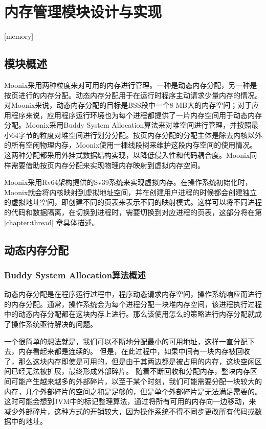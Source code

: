 
\chapter{内存管理模块设计与实现}[memory]
\label{chapter:memory}

\section{模块概述}

Moonix采用两种粒度来对可用的内存进行管理。一种是动态内存分配，另一种是按页进行的内存分配。动态内存分配用于在运行时程序主动请求少量内存的情况。对Moonix来说，动态内存分配的目标是BSS段中一个8 MB大的内存空间；对于应用程序来说，应用程序运行环境也为每个进程都提供了一片内存空间用于动态内存分配。Moonix采用Buddy System Allocation算法来对堆空间进行管理，并按照最小64字节的粒度对堆空间进行划分分配。按页内存分配的分配主体是除去内核以外的所有空闲物理内存，Moonix使用一棵线段树来维护这段内存空间的使用情况。这两种分配都采用外挂式数据结构实现，以降低侵入性和代码耦合度。Moonix同样需要借助按页内存分配来实现物理内存映射到虚拟内存空间。

Moonix采用Rv64架构提供的Sv39系统来实现虚拟内存。在操作系统初始化时，Moonix就会将内核映射到虚拟地址空间，并在创建用户进程的时候都会创建独立的虚拟地址空间，即创建不同的页表来表示不同的映射模式。这样可以将不同进程的代码和数据隔离，在切换到进程时，需要切换到对应进程的页表，这部分将在第 \ref{chapter:thread} 章具体描述。

\section{动态内存分配}

\subsection{Buddy System Allocation算法概述}

动态内存分配是在程序运行过程中，程序动态请求内存空间，操作系统响应而进行的内存分配。通常，操作系统会为每个进程分配一块堆内存空间，该进程执行过程中的动态内存分配都在这块内存上进行。那么该使用怎么的策略进行内存分配就成了操作系统亟待解决的问题。

一个很简单的想法就是，我们可以不断地分配最小的可用地址，这样一直分配下去，内存看起来都是连续的。
但是，在此过程中，如果中间有一块内存被回收了，那么这块内存即使是可用的，但是由于其两边都是被占用的内存，这块空闲区间已经无法被扩展，最终形成外部碎片。
随着不断回收和分配内存，整块内存区间可能产生越来越多的外部碎片，以至于某个时刻，我们可能需要分配一块较大的内存，几个外部碎片的空间之和是足够的，但是单个外部碎片是无法满足需要的。这时可能会想到JVM中的标记整理算法，通过将所有可用的内存向一边移动，来减少外部碎片，这种方式的开销较大，因为操作系统不得不同步更改所有代码或数据中的地址。

